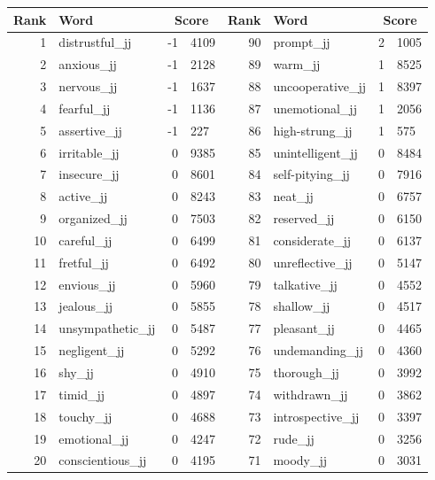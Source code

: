 \begin{table}[tbp]
    \begin{tabular}{| rlr@{.}l | rlr@{.}l |}
    \hline
    \textbf{Rank} & \textbf{Word} & \multicolumn{2}{c|}{\textbf{Score}} & \textbf{Rank} & \textbf{Word} & \multicolumn{2}{c|}{\textbf{Score}} \\
    \hline
    1 & distrustful\_jj & -1 & 4109    &    90 & prompt\_jj & 2 & 1005 \\
    2 & anxious\_jj & -1 & 2128    &    89 & warm\_jj & 1 & 8525 \\
    3 & nervous\_jj & -1 & 1637    &    88 & uncooperative\_jj & 1 & 8397 \\
    4 & fearful\_jj & -1 & 1136    &    87 & unemotional\_jj & 1 & 2056 \\
    5 & assertive\_jj & -1 & 227    &    86 & high-strung\_jj & 1 & 575 \\
    6 & irritable\_jj & 0 & 9385    &    85 & unintelligent\_jj & 0 & 8484 \\
    7 & insecure\_jj & 0 & 8601    &    84 & self-pitying\_jj & 0 & 7916 \\
    8 & active\_jj & 0 & 8243    &    83 & neat\_jj & 0 & 6757 \\
    9 & organized\_jj & 0 & 7503    &    82 & reserved\_jj & 0 & 6150 \\
    10 & careful\_jj & 0 & 6499    &    81 & considerate\_jj & 0 & 6137 \\
    11 & fretful\_jj & 0 & 6492    &    80 & unreflective\_jj & 0 & 5147 \\
    12 & envious\_jj & 0 & 5960    &    79 & talkative\_jj & 0 & 4552 \\
    13 & jealous\_jj & 0 & 5855    &    78 & shallow\_jj & 0 & 4517 \\
    14 & unsympathetic\_jj & 0 & 5487    &    77 & pleasant\_jj & 0 & 4465 \\
    15 & negligent\_jj & 0 & 5292    &    76 & undemanding\_jj & 0 & 4360 \\
    16 & shy\_jj & 0 & 4910    &    75 & thorough\_jj & 0 & 3992 \\
    17 & timid\_jj & 0 & 4897    &    74 & withdrawn\_jj & 0 & 3862 \\
    18 & touchy\_jj & 0 & 4688    &    73 & introspective\_jj & 0 & 3397 \\
    19 & emotional\_jj & 0 & 4247    &    72 & rude\_jj & 0 & 3256 \\
    20 & conscientious\_jj & 0 & 4195    &    71 & moody\_jj & 0 & 3031 \\

\end{tabular}
\end{table}
